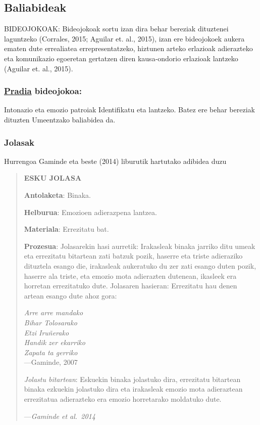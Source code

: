 \documentclass[
]{book}
\begin{document}
\hypertarget{baliabideak}{%
\subsection{Baliabideak}\label{baliabideak}}

BIDEOJOKOAK: Bideojokoak sortu izan dira behar bereziak dituztenei
laguntzeko (Corrales, 2015; Aguilar et. al., 2015), izan ere bideojokoek aukera
ematen dute errealiatea errepresentatzeko, hiztunen arteko erlazioak
adierazteko eta komunikazio egoeretan gertatzen diren kausa-ondorio erlazioak
lantzeko (Aguilar et. al., 2015).

\hypertarget{pradia-bideojokoa}{%
\subsubsection{\texorpdfstring{\href{http://pradia.net/}{Pradia} bideojokoa:}{Pradia bideojokoa:}}\label{pradia-bideojokoa}}

Intonazio eta emozio patroiak
Identifikatu eta lantzeko.
Batez ere behar bereziak dituzten
Umeentzako baliabidea da.

\hypertarget{jolasak}{%
\subsubsection{Jolasak}\label{jolasak}}

Hurrengoa Gaminde eta beste (2014) liburutik hartutako adibidea duzu

\begin{quote}
\textbf{ESKU JOLASA}

\textbf{Antolaketa}: Binaka.

\textbf{Helburua}: Emozioen adierazpena lantzea.

\textbf{Materiala}: Errezitatu bat.

\textbf{Prozesua}: Jolasarekin hasi aurretik: Irakasleak binaka jarriko ditu umeak
eta errezitatu bitartean zati batzuk pozik, haserre eta triste adieraziko
dituztela esango die, irakasleak aukeratuko du zer zati esango duten
pozik, haserre ala triste, eta emozio mota adierazten dutenean, ikasleek
era horretan errezitatuko dute.
Jolasaren hasieran: Errezitatu hau denen artean esango dute ahoz
gora:

\emph{Arre arre mandako\\
Bihar Tolosarako\\
Etzi Iruñerako\\
Handik zer ekarriko\\
Zapata ta gerriko}\\
---Gaminde, 2007

\emph{Jolastu bitartean}: Eskuekin binaka jolastuko dira, errezitatu bitartean
binaka ezkuekin jolastuko dira eta irakasleak emozio mota adieraztean
errezitatua adierazteko era emozio horretarako moldatuko dute.

---\emph{Gaminde et al.~2014}
\end{quote}
\end{document}
